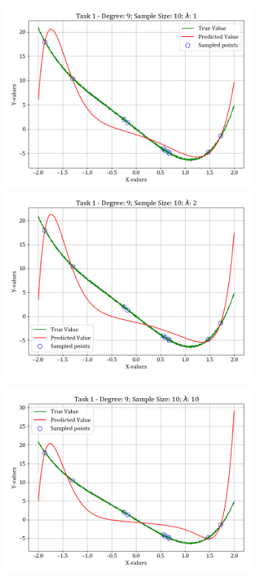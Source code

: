 \documentclass[12pt,a4paper]{article}
\begin{document}
\begin{figure}[H]
\begin{subfigure}{\textwidth}
    \includegraphics[scale=0.45]{images/t1_d1/d_9_size_10_l_1.png}
    \includegraphics[scale=0.45]{images/t1_d1/d_9_size_10_l_2.png}
    \end{subfigure}
    \ContinuedFloat
    \begin{subfigure}{\textwidth}
    \includegraphics[scale=0.45]{images/t1_d1/d_9_size_10_l_10.png}

\end{subfigure}
\end{figure}
\end{document}
